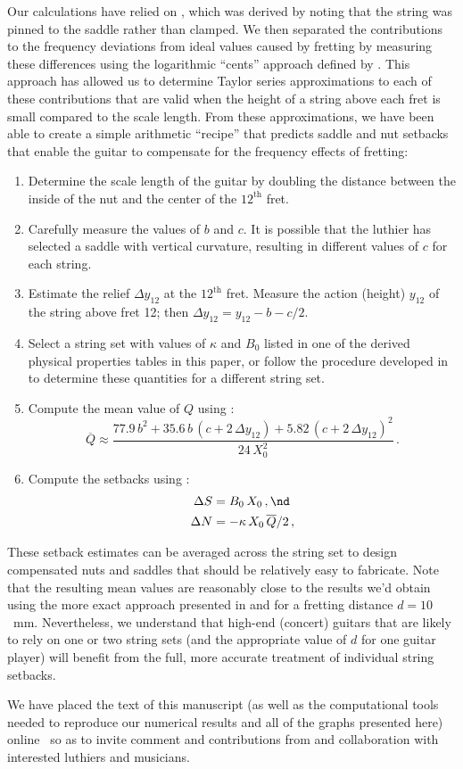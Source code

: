 Our calculations have relied on , which was derived by noting that the string was pinned to the saddle rather than clamped. We then separated the contributions to the frequency deviations from ideal values caused by fretting by measuring these differences using the logarithmic ``cents'' approach defined by . This approach has allowed us to determine Taylor series approximations to each of these contributions that are valid when the height of a string above each fret is small compared to the scale length. From these approximations, we have been able to create a simple arithmetic ``recipe'' that predicts saddle and nut setbacks that enable the guitar to compensate for the frequency effects  of fretting:
\begin{enumerate}
    \item Determine the scale length of the guitar by doubling the distance between the inside of the nut and the center of the $12^\textrm{th}$ fret. 
    \item Carefully measure the values of $b$ and $c$. It is possible that the luthier has selected a saddle with vertical curvature, resulting in different values of $c$ for each string.
    \item Estimate the relief $\Delta y_{12}$ at the $12^\textrm{th}$ fret. Measure the action (height) $y_{12}$ of the string above fret 12; then $\Delta y_{12} = y_{12} - b - c/2$.
    \item Select a string set with values of $\kappa$ and $B_0$ listed in one of the derived physical properties tables in this paper, or follow the procedure developed in  to determine these quantities for a different string set.
    \item Compute the mean value of $Q$ using :
    \begin{equation*}
        \overline{Q} \approx \frac{77.9\, b^2 + 35.6\, b\, \left(c + 2\, \Delta y_{12}\right) + 5.82\, \left(c + 2\, \Delta y_{12}\right)^2}{24\, X_0^2}\, .
    \end{equation*}
    \item Compute the setbacks using :
    \begin{align*}
        \Delta S &= B_0\, X_0\, , \nd \\
        \Delta N &= - \kappa\, X_0\, \overline{Q} / 2\, ,
    \end{align*}
\end{enumerate}
These setback estimates can be averaged across the string set to design compensated nuts and saddles that should be relatively easy to fabricate. Note that the resulting mean values are reasonably close to the results we'd obtain using the more exact approach presented in  and  for a fretting distance $d = 10$~mm. Nevertheless, we understand that high-end (concert) guitars that are likely to rely on one or two string sets (and the appropriate value of $d$ for one guitar player) will benefit from the full, more accurate treatment of individual string setbacks.

We have placed the text of this manuscript (as well as the computational tools needed to reproduce our numerical results and all of the graphs presented here) online~\cite{ref:github2021rgb} so as to invite comment and contributions from and collaboration with interested luthiers and musicians.